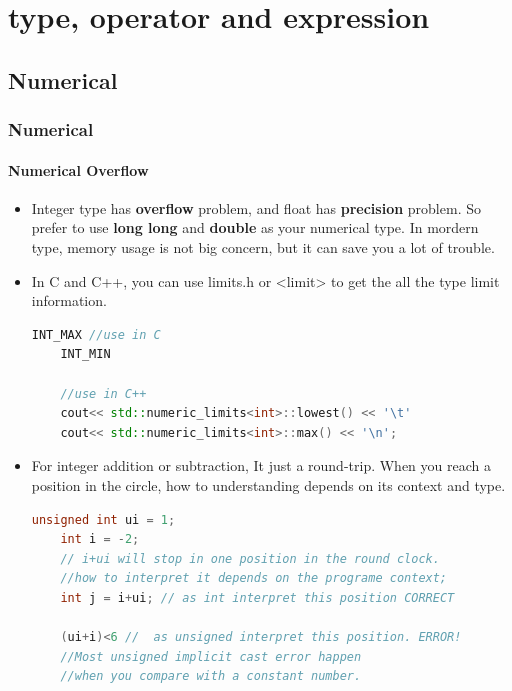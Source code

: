 \documentclass[a4paper,11pt,twoside]{book}
\begin{document}
\chapter{type, operator and expression}

\section{Numerical}
\subsection{Numerical}
\subsubsection{Numerical Overflow}

\begin{itemize}
	\item Integer type has \textbf{overflow} problem, and float has \textbf{precision} problem. So prefer to use \textbf{long long} and \textbf{double} as your numerical type. In mordern type, memory usage is not big concern, but it can save you a lot of trouble. 
	
	\item In C and C++, you can use limits.h or <limit> to get the all the type limit information.
	
	\begin{lstlisting}[frame=single, language=c++]
	INT_MAX //use in C
	INT_MIN
	
	//use in C++
	cout<< std::numeric_limits<int>::lowest() << '\t'
	cout<< std::numeric_limits<int>::max() << '\n';
	\end{lstlisting}
	
	\item For integer addition or subtraction, It just a round-trip. When you reach a position in the circle, how to understanding depends on its context and type.
	
	\begin{lstlisting}[frame=single, language=c++]
	unsigned int ui = 1;
	int i = -2;
	// i+ui will stop in one position in the round clock.
	//how to interpret it depends on the programe context;
	int j = i+ui; // as int interpret this position CORRECT
	
	(ui+i)<6 //  as unsigned interpret this position. ERROR!
	//Most unsigned implicit cast error happen 
	//when you compare with a constant number.
	\end{lstlisting}
	

\end{itemize}
\end{document}
